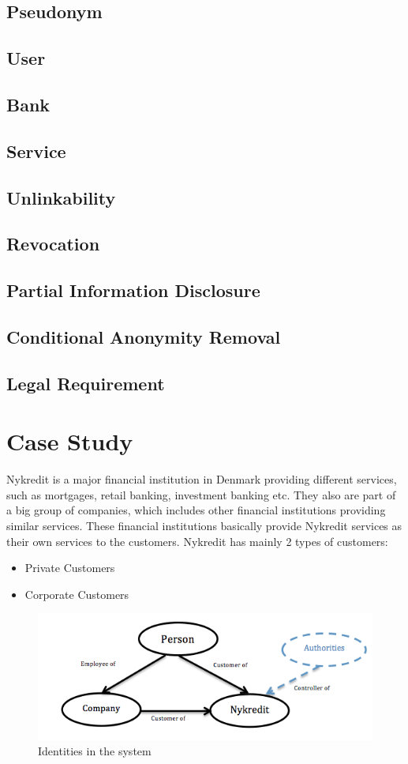 \subsection{Pseudonym}
\subsection{User}
\subsection{Bank}
\subsection{Service}
\subsection{Unlinkability}
\subsection{Revocation}
\subsection{Partial Information Disclosure}
\subsection{Conditional Anonymity Removal}
\subsection{Legal Requirement}
\section{Case Study}
Nykredit is a major financial institution in Denmark providing different services, such as mortgages, retail banking, investment banking etc. They also are part of a big group of companies, which includes other financial institutions providing similar services. These financial institutions basically provide Nykredit services as their own services to the customers.
Nykredit has mainly 2 types of customers:
\begin{itemize}
\item Private Customers
\item Corporate Customers
\end{itemize}
\begin{figure}[h]
	\centering
	\includegraphics[width=\textwidth]{figures/Customers}
	\caption{Identities in the system}
	\label{fig:Customers}
\end{figure}
